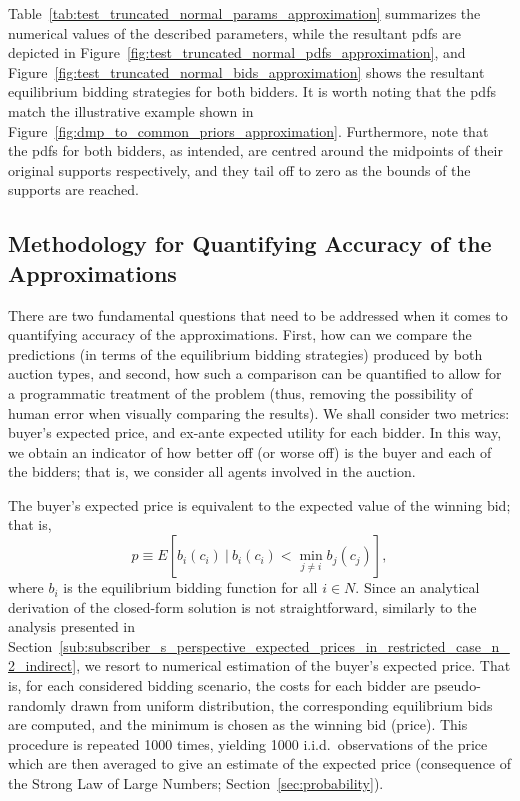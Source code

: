 Table~\ref{tab:test_truncated_normal_params_approximation} summarizes the numerical values of the described parameters, while the resultant pdfs are depicted in Figure~\ref{fig:test_truncated_normal_pdfs_approximation}, and Figure~\ref{fig:test_truncated_normal_bids_approximation} shows the resultant equilibrium bidding strategies for both bidders. It is worth noting that the pdfs match the illustrative example shown in Figure~\ref{fig:dmp_to_common_priors_approximation}. Furthermore, note that the pdfs for both bidders, as intended, are centred around the midpoints of their original supports respectively, and they tail off to zero as the bounds of the supports are reached.

\subsection{Methodology for Quantifying Accuracy of the Approximations} %
\label{sub:methodology_for_quantifying_accuracy_of_the_approximations_approximation}
There are two fundamental questions that need to be addressed when it comes to quantifying accuracy of the approximations. First, how can we compare the predictions (in terms of the equilibrium bidding strategies) produced by both auction types, and second, how such a comparison can be quantified to allow for a programmatic treatment of the problem (thus, removing the possibility of human error when visually comparing the results). We shall consider two metrics: buyer's expected price, and ex-ante expected utility for each bidder. In this way, we obtain an indicator of how better off (or worse off) is the buyer and each of the bidders; that is, we consider all agents involved in the auction.

The buyer's expected price is equivalent to the expected value of the winning bid; that is,
\begin{equation}
  \label{eq:expected_price_approximation}
  p \equiv E[b_i(c_i) \:\vert\: b_i(c_i) < \min_{j\neq i} b_j(c_j)],
\end{equation}
where $b_i$ is the equilibrium bidding function for all $i\in N$. Since an analytical derivation of the closed-form solution is not straightforward, similarly to the analysis presented in Section~\ref{sub:subscriber_s_perspective_expected_prices_in_restricted_case_n_2_indirect}, we resort to numerical estimation of the buyer's expected price. That is, for each considered bidding scenario, the costs for each bidder are pseudo-randomly drawn from uniform distribution, the corresponding equilibrium bids are computed, and the minimum is chosen as the winning bid (price). This procedure is repeated 1000 times, yielding 1000 i.i.d.~observations of the price which are then averaged to give an estimate of the expected price (consequence of the Strong Law of Large Numbers; Section~\ref{sec:probability}).

